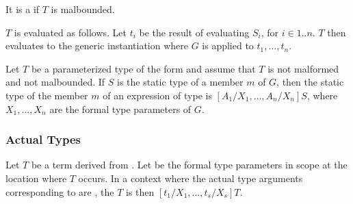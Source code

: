 \documentclass[makeidx]{article}
\begin{document}
{\LMHash{}%
It is a  if $T$ is malbounded.

\LMHash{}%
$T$ is evaluated as follows.
Let $t_i$ be the result of evaluating $S_i$, for $i \in 1 .. n$.
$T$ then evaluates to the generic instantiation
where $G$ is applied to $t_1, \ldots, t_n$.

\LMHash{}%
Let $T$ be a parameterized type of the form
and assume that $T$ is not malformed and not malbounded.
If $S$ is the static type of a member $m$ of $G$,
then the static type of the member $m$ of an expression of type
is
$[A_1/X_1, \ldots, A_n/X_n]S$,
where $X_1, \ldots, X_n$ are the formal type parameters of $G$.



\subsubsection{Actual Types}

%

\LMHash{}%
Let $T$ be a term derived from .
Let  be the formal type parameters in scope
at the location where $T$ occurs.
In a context where the actual type arguments corresponding to
 are ,
the  $T$ is then
$[t_1/X_1, \ldots, t_s/X_s]T$.

}
\end{document}
